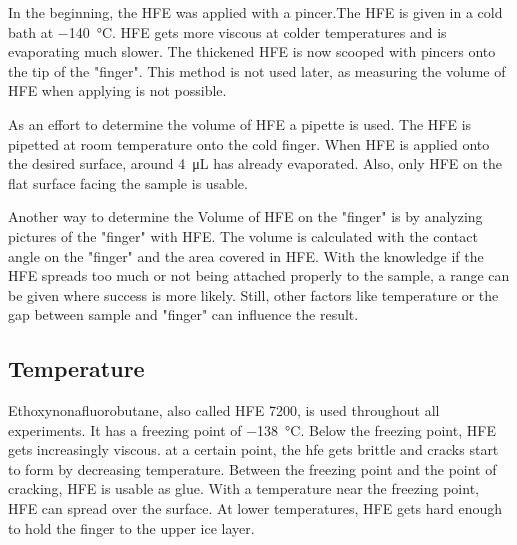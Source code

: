 In the beginning, the HFE was applied with a pincer.The HFE is given in a cold bath at \SI{-140}{\degreeCelsius}. HFE gets more viscous at colder temperatures and is evaporating much slower. The thickened HFE is now scooped with pincers onto the tip of the "finger". This method is not used later, as measuring the volume of HFE when applying is not possible.

As an effort to determine the volume of HFE a pipette is used. The HFE is pipetted at room temperature onto the cold finger. When HFE is applied onto the desired surface, around \SI{4}{\micro\liter} has already evaporated. Also, only HFE on the flat surface facing the sample is usable.

Another way to determine the Volume of HFE on the "finger" is by analyzing pictures of the "finger" with HFE. The volume is calculated with the contact angle on the "finger" and the area covered in HFE. With the knowledge if the HFE spreads too much or not being attached properly to the sample, a range can be given where success is more likely. Still, other factors like temperature or the gap between sample and "finger" can influence the result.




\subsection{Temperature}

Ethoxynonafluorobutane, also called HFE 7200, is used throughout all experiments. It has a freezing point of \SI{-138}{\degreeCelsius}. Below the freezing point, HFE gets increasingly viscous. at a certain point, the hfe gets brittle and cracks start to form by decreasing temperature. Between the freezing point and the point of cracking, HFE is usable as glue. With a temperature near the freezing point, HFE can spread over the surface. At lower temperatures, HFE gets hard enough to hold the finger to the upper ice layer.

